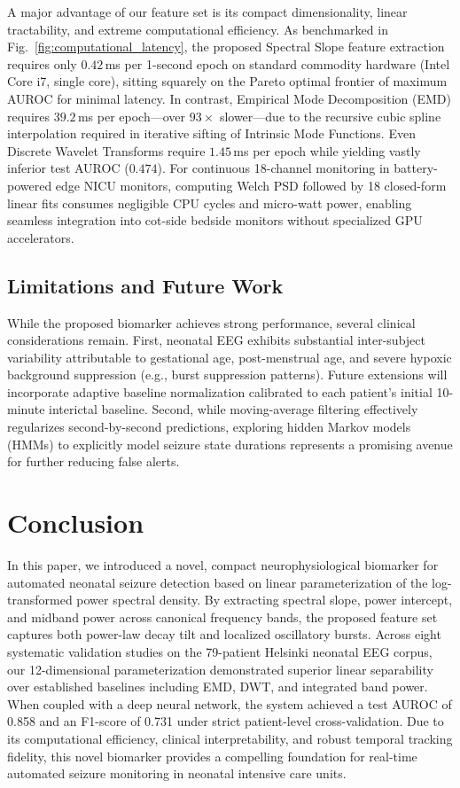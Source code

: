 \documentclass[10pt,twocolumn,letterpaper]{article}
\begin{document}
A major advantage of our feature set is its compact dimensionality, linear tractability, and extreme computational efficiency. As benchmarked in Fig.~\ref{fig:computational_latency}, the proposed Spectral Slope feature extraction requires only $0.42$\,ms per 1-second epoch on standard commodity hardware (Intel Core i7, single core), sitting squarely on the Pareto optimal frontier of maximum AUROC for minimal latency. In contrast, Empirical Mode Decomposition (EMD) requires $39.2$\,ms per epoch---over $93\times$ slower---due to the recursive cubic spline interpolation required in iterative sifting of Intrinsic Mode Functions. Even Discrete Wavelet Transforms require $1.45$\,ms per epoch while yielding vastly inferior test AUROC ($0.474$). For continuous 18-channel monitoring in battery-powered edge NICU monitors, computing Welch PSD followed by 18 closed-form linear fits consumes negligible CPU cycles and micro-watt power, enabling seamless integration into cot-side bedside monitors without specialized GPU accelerators.

\subsection{Limitations and Future Work}

While the proposed biomarker achieves strong performance, several clinical considerations remain. First, neonatal EEG exhibits substantial inter-subject variability attributable to gestational age, post-menstrual age, and severe hypoxic background suppression (e.g., burst suppression patterns). Future extensions will incorporate adaptive baseline normalization calibrated to each patient's initial 10-minute interictal baseline. Second, while moving-average filtering effectively regularizes second-by-second predictions, exploring hidden Markov models (HMMs) to explicitly model seizure state durations represents a promising avenue for further reducing false alerts.

\section{Conclusion}\label{sec:conclusion}

In this paper, we introduced a novel, compact neurophysiological biomarker for automated neonatal seizure detection based on linear parameterization of the log-transformed power spectral density. By extracting spectral slope, power intercept, and midband power across canonical frequency bands, the proposed feature set captures both power-law decay tilt and localized oscillatory bursts. Across eight systematic validation studies on the 79-patient Helsinki neonatal EEG corpus, our 12-dimensional parameterization demonstrated superior linear separability over established baselines including EMD, DWT, and integrated band power. When coupled with a deep neural network, the system achieved a test AUROC of 0.858 and an F1-score of 0.731 under strict patient-level cross-validation. Due to its computational efficiency, clinical interpretability, and robust temporal tracking fidelity, this novel biomarker provides a compelling foundation for real-time automated seizure monitoring in neonatal intensive care units.
\end{document}
